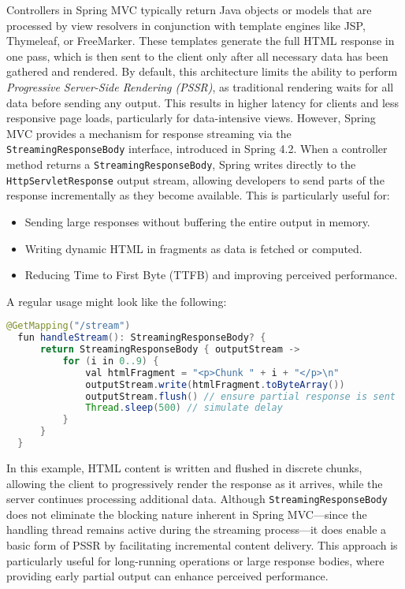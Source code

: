 Controllers in Spring MVC typically return Java objects or models that are
processed by view resolvers in conjunction with template engines like JSP,
Thymeleaf, or FreeMarker. These templates generate the full HTML response in
one pass, which is then sent to the client only after all necessary data has
been gathered and rendered. By default, this architecture limits the ability to
perform \textit{Progressive Server-Side Rendering (PSSR)}, as traditional
rendering waits for all data before sending any output. This results in higher
latency for clients and less responsive page loads, particularly for
data-intensive views. However, Spring MVC provides a mechanism for response
streaming via the \texttt{StreamingResponseBody} interface, introduced in
Spring 4.2. When a controller method returns a \texttt{StreamingResponseBody},
Spring writes directly to the \texttt{HttpServletResponse} output stream,
allowing developers to send parts of the response incrementally as they become
available. This is particularly useful for:
\begin{itemize}
  \item Sending large responses without buffering the entire output in memory.
  \item Writing dynamic HTML in fragments as data is fetched or computed.
  \item Reducing Time to First Byte (TTFB) and improving perceived performance.
\end{itemize}

A regular usage might look like the following:
\begin{lstlisting}[language=Java]
  @GetMapping("/stream")
  fun handleStream(): StreamingResponseBody? {
      return StreamingResponseBody { outputStream ->
          for (i in 0..9) {
              val htmlFragment = "<p>Chunk " + i + "</p>\n"
              outputStream.write(htmlFragment.toByteArray())
              outputStream.flush() // ensure partial response is sent
              Thread.sleep(500) // simulate delay
          }
      }
  }
\end{lstlisting}

In this example, HTML content is written and flushed in discrete chunks,
allowing the client to progressively render the response as it arrives, while
the server continues processing additional data. Although
\texttt{StreamingResponseBody} does not eliminate the blocking nature inherent
in Spring MVC—since the handling thread remains active during the streaming
process—it does enable a basic form of PSSR by facilitating incremental content
delivery. This approach is particularly useful for long-running operations or
large response bodies, where providing early partial output can enhance
perceived performance.

